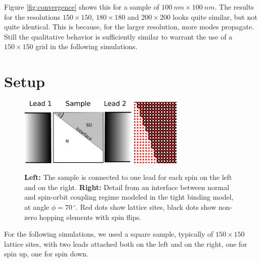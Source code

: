 Figure \ref{fig:convergence} shows this for a sample of $100~nm \times 100~nm$.
The results for the resolutions $150 \times 150$, $180 \times 180$ and $200
\times 200$ looks quite similar, but not quite identical. This is because, for
the larger resolution, more modes propagate. Still the qualitative behavior is
sufficiently similar to warrant the use of a $150 \times 150$ grid in the
following simulations.

\section{Setup}
\label{sec:numeric-setup}

\begin{figure}[htb]
    \begin{center}
        \includegraphics[width=0.5\textwidth]{sample-lead-interface.pdf}%
        \hspace{0.1\textwidth}%
        \includegraphics[width=0.2\textwidth]{hopping.png}
    \end{center}
    \caption{\textbf{Left:} The sample is connected to one lead for each spin
        on the left and on the right.
        \textbf{Right:}
        Detail from an interface between normal and spin-orbit coupling regime modeled
        in the tight binding model, at angle $\phi = 70\,^{\circ}$.
        Red dots show lattice sites, black dots
        show non-zero hopping elements with spin flips.}
    \label{fig:interface-setup}
\end{figure}

For the following simulations, we used a square sample, typically of $150
\times 150$ lattice sites, with two leads attached both on the left and on the
right, one for spin up, one for spin down.

